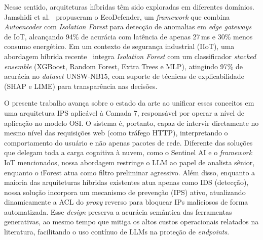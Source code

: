 \documentclass[sigconf, anonymous]{acmart}
\begin{document}
Nesse sentido, arquiteturas híbridas têm sido exploradas em diferentes domínios. Jamshidi et al.~\cite{jamshidi_ecodefender} propuseram o EcoDefender, um \textit{framework} que combina \textit{Autoencoder} com \textit{Isolation Forest} para detecção de anomalias em \textit{edge gateways} de IoT, alcançando 94\% de acurácia com latência de apenas 27\,ms e 30\% menos consumo energético. Em um contexto de segurança industrial (IIoT), uma abordagem híbrida recente~\cite{iiot_hybrid} integra \textit{Isolation Forest} com um classificador \textit{stacked ensemble} (XGBoost, Random Forest, Extra Trees e MLP), atingindo 97\% de acurácia no \textit{dataset} UNSW-NB15, com suporte de técnicas de explicabilidade (SHAP e LIME) para transparência nas decisões.

O presente trabalho avança sobre o estado da arte ao unificar esses conceitos em uma arquitetura \ac{IPS} aplicável à Camada 7, responsável por operar a nível de aplicação no modelo OSI. O sistema é, portanto, capaz de intervir diretamente no mesmo nível das requisições web (como tráfego HTTP), interpretando o comportamento do usuário e não apenas pacotes de rede. Diferente das soluções que delegam toda a carga cognitiva à nuvem, como o Sentinel AI e o \textit{framework} IoT mencionados, nossa abordagem restringe o \ac{LLM} ao papel de analista sênior, enquanto o \ac{iForest} atua como filtro preliminar agressivo. Além disso, enquanto a maioria das arquiteturas híbridas existentes atua apenas como \ac{IDS} (detecção), nossa solução incorpora um mecanismo de prevenção (\ac{IPS}) ativo, atualizando dinamicamente a \ac{ACL} do \textit{proxy} reverso para bloquear IPs maliciosos de forma automatizada. Esse \textit{design} preserva a acurácia semântica das ferramentas generativas, ao mesmo tempo que mitiga os altos custos operacionais relatados na literatura, facilitando o uso contínuo de \acp{LLM} na proteção de \textit{endpoints}.
\end{document}
